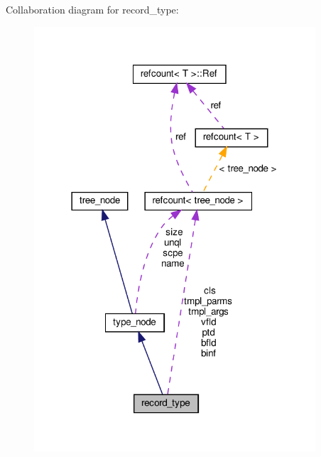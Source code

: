 Collaboration diagram for record\+\_\+type\+:
\nopagebreak
\begin{figure}[H]
\begin{center}
\leavevmode
\includegraphics[width=297pt]{dd/d1a/structrecord__type__coll__graph}
\end{center}
\end{figure}
